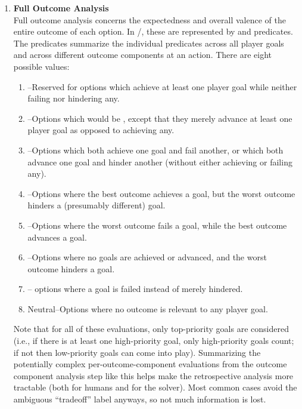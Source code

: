 \begin{enumerate}
  \item %
    \textbf{Full Outcome Analysis} \\
    Full outcome analysis concerns the expectedness and overall valence of the entire outcome of each option.
    In \dunyazad/, these are represented by   and  predicates.
    The  predicates summarize the individual  predicates across all player goals and across different outcome components at an action.
    There are eight possible  values:
    \begin{enumerate}
      \item {}--Reserved for options which achieve at least one player goal while neither failing nor hindering any.
      \item {}--Options which would be , except that they merely advance at least one player goal as opposed to achieving any.
      \item {}--Options which both achieve one goal and fail another, or which both advance one goal and hinder another (without either achieving or failing any).
      \item {}--Options where the best outcome achieves a goal, but the worst outcome hinders a (presumably different) goal.
      \item {}--Options where the worst outcome fails a goal, while the best outcome advances a goal.
      \item {}--Options where no goals are achieved or advanced, and the worst outcome hinders a goal.
      \item {}-- options where a goal is failed instead of merely hindered.
      \item Neutral--Options where no outcome is relevant to any player goal.
    \end{enumerate}
    Note that for all of these evaluations, only top-priority goals are considered (i.e., if there is at least one high-priority goal, only high-priority goals count; if not then low-priority goals can come into play).
    Summarizing the potentially complex per-outcome-component evaluations from the outcome component analysis step like this helps make the retrospective analysis more tractable (both for humans and for the solver).
    Most common cases avoid the ambiguous ``tradeoff'' label anyways, so not much information is lost.


\end{enumerate}
